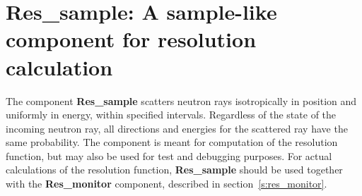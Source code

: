 
\section{Res\_sample: A sample-like component for resolution calculation}
\label{s:res_sample}


The component \textbf{Res\_sample} scatters neutron rays isotropically
in position and uniformly in energy, within specified intervals. 
Regardless of the state of the incoming neutron ray, 
all directions and energies for the
scattered ray have the same probability. The component is meant
for computation of the resolution function, but may also be used
for test and debugging purposes. For actual calculations of the resolution
function, {\bf Res\_sample} should be used
together with the \textbf{Res\_monitor} component, described in
section~\ref{s:res_monitor}.

